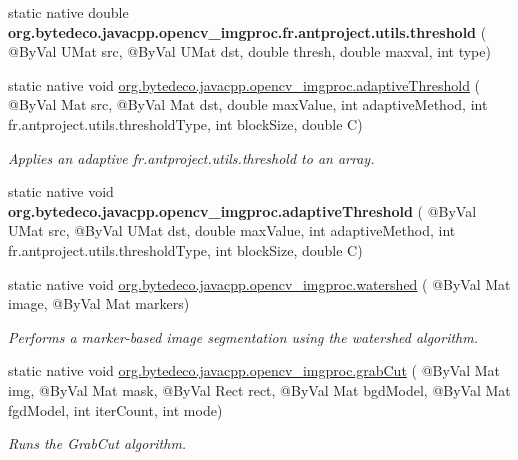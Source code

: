 \begin{DoxyCompactItemize}
\item 
\mbox{\label{group__imgproc__misc_gacc27bb1c53e540ff57759a7b2170f675}} 
static native double {\bfseries org.\+bytedeco.\+javacpp.\+opencv\+\_\+imgproc.\+fr.antproject.utils.threshold} ( @By\+Val U\+Mat src, @By\+Val U\+Mat dst, double thresh, double maxval, int type)
\item 
static native void \hyperlink{group__imgproc__misc_ga7901ddcd72f108577c88250a35b9ccbd}{org.\+bytedeco.\+javacpp.\+opencv\+\_\+imgproc.\+adaptive\+Threshold} ( @By\+Val Mat src, @By\+Val Mat dst, double max\+Value, int adaptive\+Method, int fr.antproject.utils.threshold\+Type, int block\+Size, double C)
\begin{DoxyCompactList}\small\item\em Applies an adaptive fr.antproject.utils.threshold to an array. \end{DoxyCompactList}\item
\mbox{\label{group__imgproc__misc_ga88adb061c727bbf5e4dc076ce4808794}} 
static native void {\bfseries org.\+bytedeco.\+javacpp.\+opencv\+\_\+imgproc.\+adaptive\+Threshold} ( @By\+Val U\+Mat src, @By\+Val U\+Mat dst, double max\+Value, int adaptive\+Method, int fr.antproject.utils.threshold\+Type, int block\+Size, double C)
\item 
static native void \hyperlink{group__imgproc__misc_ga997b28508969435b04cb1bcb8ebc0841}{org.\+bytedeco.\+javacpp.\+opencv\+\_\+imgproc.\+watershed} ( @By\+Val Mat image, @By\+Val Mat markers)
\begin{DoxyCompactList}\small\item\em Performs a marker-\/based image segmentation using the watershed algorithm. \end{DoxyCompactList}\item 
static native void \hyperlink{group__imgproc__misc_gaa33f53e9a934a40de2e80d2cec508ba2}{org.\+bytedeco.\+javacpp.\+opencv\+\_\+imgproc.\+grab\+Cut} ( @By\+Val Mat img, @By\+Val Mat mask, @By\+Val Rect rect, @By\+Val Mat bgd\+Model, @By\+Val Mat fgd\+Model, int iter\+Count, int mode)
\begin{DoxyCompactList}\small\item\em Runs the Grab\+Cut algorithm. \end{DoxyCompactList}\item 
\mbox{\label{group__imgproc__misc_ga3b3ac233c67fb26b0106a5581fdffeef}} 

\end{DoxyCompactItemize}
